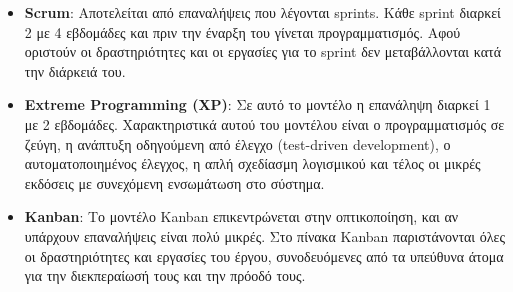\begin{itemize}
    \item \textbf{Scrum}: Αποτελείται από επαναλήψεις που λέγονται sprints. Κάθε sprint διαρκεί 2 με 4 εβδομάδες και πριν την έναρξη του γίνεται προγραμματισμός. Αφού οριστούν οι δραστηριότητες και οι εργασίες για το sprint δεν μεταβάλλονται κατά την διάρκειά του.
    \item \textbf{Extreme Programming (XP)}: Σε αυτό το μοντέλο η επανάληψη διαρκεί 1 με 2 εβδομάδες. Χαρακτηριστικά αυτού του μοντέλου είναι ο προγραμματισμός σε ζεύγη, η ανάπτυξη οδηγούμενη από έλεγχο (test-driven development), ο αυτοματοποιημένος έλεγχος, η απλή σχεδίασμη λογισμικού και τέλος οι μικρές εκδόσεις με συνεχόμενη ενσωμάτωση στο σύστημα.
    \item \textbf{Kanban}: Το μοντέλο Kanban επικεντρώνεται στην οπτικοποίηση, και αν υπάρχουν επαναλήψεις είναι πολύ μικρές. Στο πίνακα Kanban παριστάνονται όλες οι δραστηριότητες και εργασίες του έργου, συνοδευόμενες από τα υπεύθυνα άτομα για την διεκπεραίωσή τους και την πρόοδό τους.
\end{itemize}